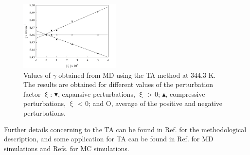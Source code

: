 \documentclass[9pt,bestpractices]{livecoms}
\begin{document}
\begin{figure}
\includegraphics[width=0.45\textwidth]{gfx/image66.jpeg}
\caption{Values of {${\gamma}$} obtained from MD using the TA method at 344.3 K. The results are obtained for different values of the perturbation factor ${\upxi}$: $\blacktriangledown$, expansive perturbations, ${\upxi}$ {\textgreater} 0; $\blacktriangle$, compressive perturbations, ${\upxi}$ {\textless} 0; and O, average of the positive and negative perturbations.}
\label{fig:20}
\end{figure}

Further details concerning to the TA can be found in Ref.
\citep{gloor2005} for the methodological description, and some
application for TA can be found in Ref. \citep{muller2009}
for MD simulations and Refs. \citep{ghoufi2016,sampayo2010} for MC simulations.
\end{document}
